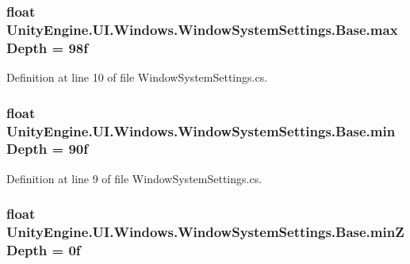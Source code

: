 \subsubsection[{max\+Depth}]{\setlength{\rightskip}{0pt plus 5cm}float Unity\+Engine.\+U\+I.\+Windows.\+Window\+System\+Settings.\+Base.\+max\+Depth = 98f}\label{class_unity_engine_1_1_u_i_1_1_windows_1_1_window_system_settings_1_1_base_a36f7cfd1fe92597bb44d35089fad7865}


Definition at line 10 of file Window\+System\+Settings.\+cs.

\hypertarget{class_unity_engine_1_1_u_i_1_1_windows_1_1_window_system_settings_1_1_base_ab9c0a30f118087b034107e0d01e2e9b4}{}
\subsubsection[{min\+Depth}]{\setlength{\rightskip}{0pt plus 5cm}float Unity\+Engine.\+U\+I.\+Windows.\+Window\+System\+Settings.\+Base.\+min\+Depth = 90f}\label{class_unity_engine_1_1_u_i_1_1_windows_1_1_window_system_settings_1_1_base_ab9c0a30f118087b034107e0d01e2e9b4}


Definition at line 9 of file Window\+System\+Settings.\+cs.

\hypertarget{class_unity_engine_1_1_u_i_1_1_windows_1_1_window_system_settings_1_1_base_a53ef951cae971389afdb0125179a3375}{}
\subsubsection[{min\+Z\+Depth}]{\setlength{\rightskip}{0pt plus 5cm}float Unity\+Engine.\+U\+I.\+Windows.\+Window\+System\+Settings.\+Base.\+min\+Z\+Depth = 0f}\label{class_unity_engine_1_1_u_i_1_1_windows_1_1_window_system_settings_1_1_base_a53ef951cae971389afdb0125179a3375}


